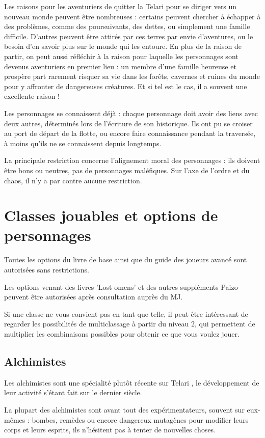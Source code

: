 \documentclass[10pt,a4paper]{book}
\newcommand{\nomorigine}{Telari }
\begin{document}
Les raisons pour les aventuriers de quitter la \nomorigine pour se diriger vers un nouveau monde peuvent être nombreuses : certains peuvent chercher à échapper à des problèmes, comme des poursuivants, des dettes, ou simplement une famille difficile. D'autres peuvent être attirés par ces terres par envie d'aventures, ou le besoin d'en savoir plus sur le monde qui les entoure. En plus de la raison de partir, on peut aussi réfléchir à la raison pour laquelle les personnages sont devenus aventuriers en premier lieu : un membre d'une famille heureuse et prospère part rarement risquer sa vie dans les forêts, cavernes et ruines du monde pour y affronter de dangereuses créatures. Et si tel est le cas, il a souvent une excellente raison !

Les personnages se connaissent déjà : chaque personnage doit avoir des liens avec deux autres, déterminés lors de l'écriture de son historique. Ils ont pu se croiser au port de départ de la flotte, ou encore faire connaissance pendant la traversée, à moins qu'ils ne se connaissent depuis longtemps.

La principale restriction concerne l'alignement moral des personnages : ils doivent être bons ou neutres, pas de personnages maléfiques. Sur l'axe de l'ordre et du chaos, il n'y a par contre aucune restriction.


\section{Classes jouables et options de personnages}
Toutes les options du livre de base ainsi que du guide des joueurs avancé sont autorisées sans restrictions.

Les options venant des livres 'Lost omens' et des autres suppléments Paizo peuvent être autorisées après consultation auprès du MJ.

Si une classe ne vous convient pas en tant que telle, il peut être intéressant de regarder les possibilités de multiclassage à partir du niveau 2, qui permettent de multiplier les combinaisons possibles pour obtenir ce que vous voulez jouer.
\subsection{Alchimistes}
Les alchimistes sont une spécialité plutôt récente sur \nomorigine, le développement de leur activité s'étant fait sur le dernier siècle. 

La plupart des alchimistes sont avant tout des expérimentateurs, souvent sur eux-mêmes : bombes, remèdes ou encore dangereux mutagènes pour modifier leurs corps et leurs esprits, ils n'hésitent pas à tenter de nouvelles choses.
\end{document}
